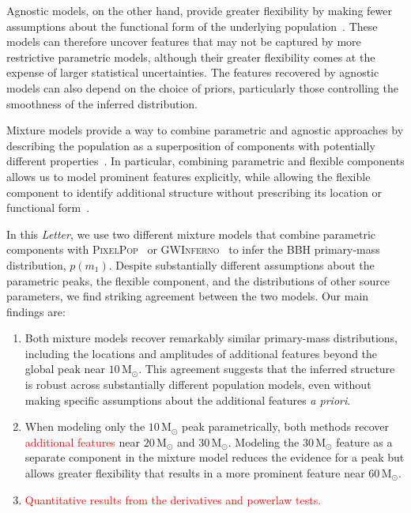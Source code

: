 \documentclass[twocolumn,twocolappendix,linenumbers]{aastex631}
\newcommand{\PixelPop}{\textsc{PixelPop}\xspace}
\newcommand{\Gwinferno}{\textsc{GWInferno}\xspace}
\newcommand{\Msun}{\ensuremath{\mathrm{M}_\odot}\xspace}
\begin{document}
Agnostic models, on the other hand, provide greater flexibility by making fewer assumptions about the functional form of the underlying population~\citep[e.g.,][]{Heinzel:2024jlc,Edelman:2021zkw,Edelman:2022ydv,Godfrey:2023oxb,Golomb:2022bon,Tiwari:2020vym,Rinaldi:2021bhm,Callister:2023tgi,Alvarez-Lopez:2025ltt,Ray:2024hos, Ray:2026qer}.
These models can therefore uncover features that may not be captured by more restrictive parametric models, although their greater flexibility comes at the expense of larger statistical uncertainties.
The features recovered by agnostic models can also depend on the choice of priors, particularly those controlling the smoothness of the inferred distribution.

Mixture models provide a way to combine parametric and agnostic approaches by describing the population as a superposition of components with potentially different properties~\citep[e.g.,][]{Tiwari:2020vym,Godfrey:2023oxb,LIGOScientific:2025pvj,LIGOScientific:2026ctl,Rinaldi:2025evs,Alvarez-Lopez:inprep}.
In particular, combining parametric and flexible components allows us to model prominent features explicitly, while allowing the flexible component to identify additional structure without prescribing its location or functional form~\citep{Godfrey:2023oxb,Alvarez-Lopez:2026ymo,Alvarez-Lopez:inprep}.

In this \emph{Letter}, we use two different mixture models that combine parametric components with \PixelPop~\citep{Alvarez-Lopez:inprep} or \Gwinferno~\citep{Edelman:2022ydv,Godfrey:2023oxb} to infer the \ac{BBH} primary-mass distribution, $p(m_1)$.
Despite substantially different assumptions about the parametric peaks, the flexible component, and the distributions of other source parameters, we find striking agreement between the two models. Our main findings are:

\begin{enumerate}
    \item Both mixture models recover remarkably similar primary-mass distributions, including the locations and amplitudes of additional features beyond the global peak near $10\,\Msun$.
    This agreement suggests that the inferred structure is robust across substantially different population models, even without making specific assumptions about the additional features \textit{a priori}.
    \item When modeling only the $10\,\Msun$ peak parametrically, both methods recover \textcolor{red}{additional features} near $20\,\Msun$ and $30\,\Msun$.
    Modeling the $30\,\Msun$ feature as a separate component in the mixture model reduces the evidence for a peak but allows greater flexibility that results in a more prominent feature near $60\,\Msun$.
    \item \textcolor{red}{Quantitative results from the derivatives and powerlaw tests.}
\end{enumerate}
\end{document}
